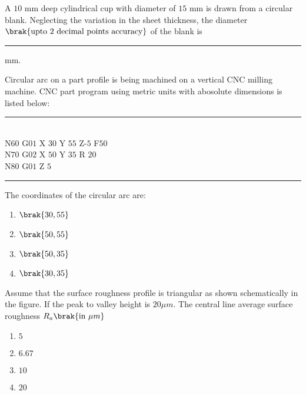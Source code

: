 \item{
A $10$ mm deep cylindrical cup with diameter of $15$ mm is drawn from a circular blank. Neglecting the variation in the sheet thickness, the diameter $\brak{\text{upto 2 decimal points accuracy}}$ of the blank is \rule{2cm}{0.15mm}mm.\\
}
\item{
Circular arc on a part profile is being machined on a vertical CNC milling machine. CNC part program using metric units with abosolute dimensions is listed below:
\rule{5cm}{0.15mm}\\
N$60$ G$01$ X $30$ Y $55$ Z-$5$ F$50$\\
N$70$ G$02$ X $50$ Y $35$ R $20$\\
N$80$ G$01$ Z $5$\\
\rule{5cm}{0.15mm}
The coordinates of the circular arc are:
\begin{multicols}{4}
    \begin{enumerate}
        \item $\brak{30,55}$
        \item $\brak{50,55}$
        \item $\brak{50,35}$
        \item $\brak{30,35} $
    \end{enumerate}
\end{multicols}
}
\item{
Assume that the surface roughness profile is triangular as shown schematically in the figure. If the peak to valley height is $20\mu m$. The central line average surface roughness $R_a\brak{\text{in }\mu m}$
\begin{figure}[H]
\centering
{}%

\label{fig:my_label}
\end{figure}
\begin{multicols}{4}
    \begin{enumerate}
        \item $5$
        \item $6.67$
        \item $10$
        \item $20$
    \end{enumerate}
\end{multicols}
}
